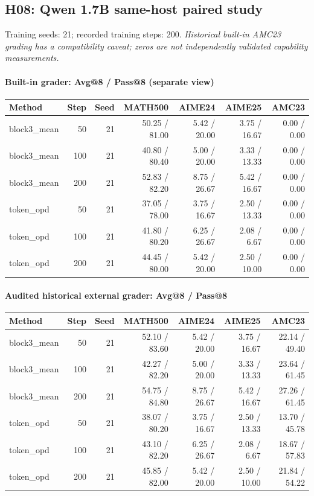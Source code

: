 \subsection{H08: Qwen 1.7B same-host paired study}
\label{history:qwen17_ml2}
Training seeds: 21; recorded training steps: 200.
\emph{Historical built-in AMC23 grading has a compatibility caveat; zeros are not independently validated capability measurements.}
\paragraph{Built-in grader: Avg@8 / Pass@8 (separate view)}
{\footnotesize\setlength{\tabcolsep}{3.5pt}
\begin{longtable}{@{}p{1.4in}rrrrrr@{}}
\toprule
Method & Step & Seed & MATH500 & AIME24 & AIME25 & AMC23 \\
\midrule\endhead
block3\_\allowbreak{}mean & 50 & 21 & 50.25 / 81.00 & 5.42 / 20.00 & 3.75 / 16.67 & 0.00 / 0.00 \\
block3\_\allowbreak{}mean & 100 & 21 & 40.80 / 80.40 & 5.00 / 20.00 & 3.33 / 13.33 & 0.00 / 0.00 \\
block3\_\allowbreak{}mean & 200 & 21 & 52.83 / 82.20 & 8.75 / 26.67 & 5.42 / 16.67 & 0.00 / 0.00 \\
token\_\allowbreak{}opd & 50 & 21 & 37.05 / 78.00 & 3.75 / 16.67 & 2.50 / 13.33 & 0.00 / 0.00 \\
token\_\allowbreak{}opd & 100 & 21 & 41.80 / 80.20 & 6.25 / 26.67 & 2.08 / 6.67 & 0.00 / 0.00 \\
token\_\allowbreak{}opd & 200 & 21 & 44.45 / 80.00 & 5.42 / 20.00 & 2.50 / 10.00 & 0.00 / 0.00 \\
\bottomrule\end{longtable}
}
\paragraph{Audited historical external grader: Avg@8 / Pass@8}
{\footnotesize\setlength{\tabcolsep}{3.5pt}
\begin{longtable}{@{}p{1.4in}rrrrrr@{}}
\toprule
Method & Step & Seed & MATH500 & AIME24 & AIME25 & AMC23 \\
\midrule\endhead
block3\_\allowbreak{}mean & 50 & 21 & 52.10 / 83.60 & 5.42 / 20.00 & 3.75 / 16.67 & 22.14 / 49.40 \\
block3\_\allowbreak{}mean & 100 & 21 & 42.27 / 82.20 & 5.00 / 20.00 & 3.33 / 13.33 & 23.64 / 61.45 \\
block3\_\allowbreak{}mean & 200 & 21 & 54.75 / 84.80 & 8.75 / 26.67 & 5.42 / 16.67 & 27.26 / 61.45 \\
token\_\allowbreak{}opd & 50 & 21 & 38.07 / 80.20 & 3.75 / 16.67 & 2.50 / 13.33 & 13.70 / 45.78 \\
token\_\allowbreak{}opd & 100 & 21 & 43.10 / 82.20 & 6.25 / 26.67 & 2.08 / 6.67 & 18.67 / 57.83 \\
token\_\allowbreak{}opd & 200 & 21 & 45.85 / 82.00 & 5.42 / 20.00 & 2.50 / 10.00 & 21.84 / 54.22 \\
\bottomrule\end{longtable}
}

